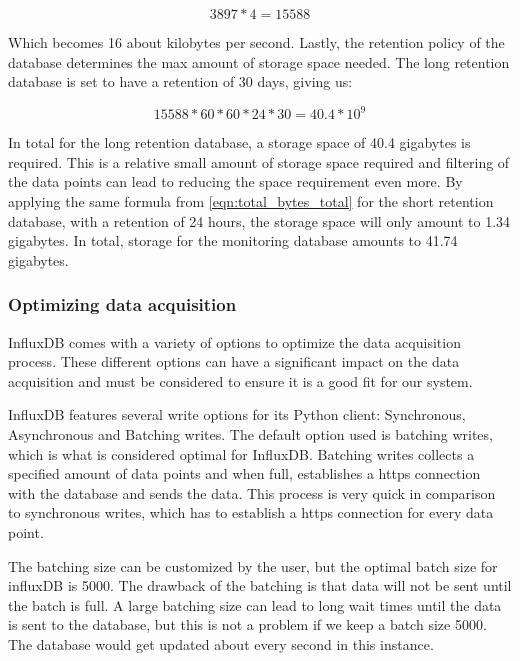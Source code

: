 \documentclass[main.tex]{subfiles}
\begin{document}
\begin{equation} \label{eqn:total_bytes_per_second}
3897*4 = 15588 
\end{equation}

Which becomes 16 about kilobytes per second. Lastly, the retention policy of the database determines the max amount of storage space needed. The long retention database is set to have a retention of 30 days, giving us:

\begin{equation} \label{eqn:total_bytes_total}
15588*60*60*24*30 = 40.4 * 10^9
\end{equation}

In total for the long retention database, a storage space of 40.4 gigabytes is required. This is a relative small amount of storage space required and filtering of the data points can lead to reducing the space requirement even more. By applying the same formula from \autoref{eqn:total_bytes_total} for the short retention database, with a retention of 24 hours, the storage space will only amount to 1.34 gigabytes. In total, storage for the monitoring database amounts to 41.74 gigabytes.



\subsubsection{Optimizing data acquisition}

InfluxDB comes with a variety of options to optimize the data acquisition process. These different options can have a significant impact on the data acquisition and must be considered to ensure it is a good fit for our system.

InfluxDB features several write options for its Python client: Synchronous, Asynchronous and Batching writes. The default option used is batching writes, which is what is considered optimal for InfluxDB. Batching writes collects a specified amount of data points and when full, establishes a https connection with the database and sends the data. This process is very quick in comparison to synchronous writes, which has to establish a https connection for every data point.

The batching size can be customized by the user, but the optimal batch size for influxDB is 5000\cite{influx_batching}. The drawback of the batching is that data will not be sent until the batch is full. A large batching size can lead to long wait times until the data is sent to the database, but this is not a problem if we keep a batch size 5000. The database would get updated about every second in this instance.
\end{document}
